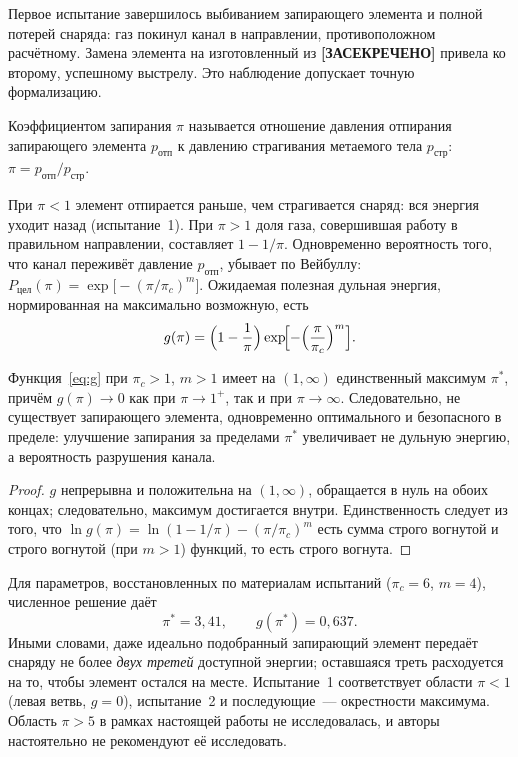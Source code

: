 \documentclass[11pt,a4paper]{article}
\newcommand{\SEC}{\textbf{[ЗАСЕКРЕЧЕНО]}}
\begin{document}
Первое испытание завершилось выбиванием запирающего элемента и полной потерей снаряда: газ покинул канал в направлении, противоположном расчётному. Замена элемента на изготовленный из \SEC{} привела ко второму, успешному выстрелу. Это наблюдение допускает точную формализацию.

\begin{definition}
Коэффициентом запирания $\pi$ называется отношение давления отпирания запирающего элемента $p_{\text{отп}}$ к давлению страгивания метаемого тела $p_{\text{стр}}$:
$\pi=p_{\text{отп}}/p_{\text{стр}}$.
\end{definition}

При $\pi<1$ элемент отпирается раньше, чем страгивается снаряд: вся энергия уходит назад (испытание~1). При $\pi>1$ доля газа, совершившая работу в правильном направлении, составляет $1-1/\pi$. Одновременно вероятность того, что канал переживёт давление $p_{\text{отп}}$, убывает по Вейбуллу: $P_{\text{цел}}(\pi)=\exp\!\bigl[-(\pi/\pi_c)^{m}\bigr]$. Ожидаемая полезная дульная энергия, нормированная на максимально возможную, есть
\begin{equation}\label{eq:g}
g(\pi)=\Bigl(1-\frac{1}{\pi}\Bigr)\exp\!\Bigl[-\Bigl(\frac{\pi}{\pi_c}\Bigr)^{m}\Bigr].
\end{equation}

\begin{theorem}\label{th:plug}
Функция~\eqref{eq:g} при $\pi_c>1$, $m>1$ имеет на $(1,\infty)$ единственный максимум $\pi^\ast$, причём $g(\pi)\to0$ как при $\pi\to1^{+}$, так и при $\pi\to\infty$. Следовательно, не существует запирающего элемента, одновременно оптимального и безопасного в пределе: улучшение запирания за пределами $\pi^\ast$ увеличивает не дульную энергию, а вероятность разрушения канала.
\end{theorem}

\begin{proof}
$g$ непрерывна и положительна на $(1,\infty)$, обращается в нуль на обоих концах; следовательно, максимум достигается внутри. Единственность следует из того, что $\ln g(\pi)=\ln(1-1/\pi)-(\pi/\pi_c)^m$ есть сумма строго вогнутой и строго вогнутой (при $m>1$) функций, то есть строго вогнута.
\end{proof}

Для параметров, восстановленных по материалам испытаний ($\pi_c=6$, $m=4$), численное решение даёт
\[
\pi^\ast=3{,}41,\qquad g(\pi^\ast)=0{,}637 .
\]
Иными словами, даже идеально подобранный запирающий элемент передаёт снаряду не более \emph{двух третей} доступной энергии; оставшаяся треть расходуется на то, чтобы элемент остался на месте. Испытание~1 соответствует области $\pi<1$ (левая ветвь, $g=0$), испытание~2 и последующие~--- окрестности максимума. Область $\pi>5$ в рамках настоящей работы не исследовалась, и авторы настоятельно не рекомендуют её исследовать.
\end{document}
